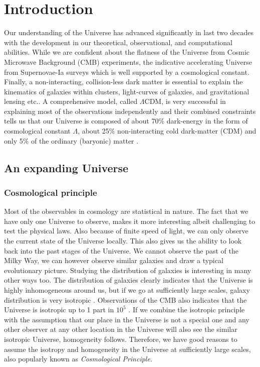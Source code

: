 \chapter{Introduction}\label{Introduction}

Our understanding of the Universe has advanced significantly in 
last two decades with the development in our 
theoretical, observational, and computational abilities. 
While we are confident about the flatness of the Universe from Cosmic Microwave 
Background (CMB) experiments, 
the indicative accelerating Universe from Supernovae-Ia surveys which is well supported
by a cosmological constant. Finally, a non-interacting, collision-less dark matter is essential 
to explain the kinematics of galaxies within clusters, light-curves of galaxies, and 
gravitational lensing etc.. A comprehensive model, called $\Lambda$CDM,
is very successful in explaining most of the observations independently and their
combined constraints tells us that our Universe is composed of about 70$\%$
dark-energy in the form of cosmological constant $\Lambda$, about 25$\%$ non-interacting
cold dark-matter (CDM) and only 5$\%$ of the ordinary (baryonic) matter 
\citep{2015arXiv150201589P}. 


\section{An expanding Universe}

\subsection{Cosmological principle}

Most of the observables in cosmology are statistical in nature. 
The fact that we have only one Universe to observe,
makes it more interesting albeit challenging to test the physical laws. Also because 
of finite speed of light, we can only observe the current state of the Universe locally. 
This also gives us the ability to look back into the past stages of the Universe. 
We cannot observe the past of the Milky Way, we can however observe similar
galaxies and draw a typical evolutionary picture. Studying the distribution of 
galaxies is interesting in many other ways too. 
The distribution of galaxies clearly indicates that the Universe is highly 
inhomogeneous around us, but if we go at sufficiently large scales, 
galaxy distribution is very isotropic \citep{2012ApJS..203...21A,2015arXiv150100963A}.
Observations of the CMB also indicates 
that the Universe is isotropic up to 1 part in $10^{5}$ \citep{2011A&A...536A..19P}. 
If we combine the isotropic principle with the 
assumption that our place in the Universe is not a special one and any other observer
at any other location in the Universe will also see the similar isotropic Universe,
homogeneity follows. Therefore, we have good reasons to assume the isotropy 
and homogeneity in the Universe at sufficiently large scales, also popularly
known as {\it Cosmological Principle}.

